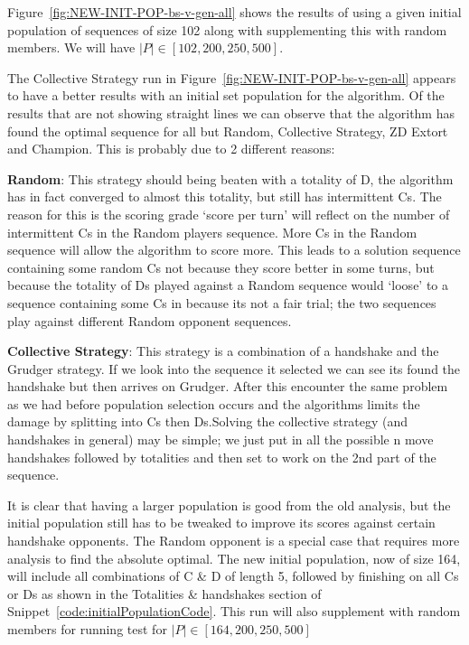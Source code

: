 Figure~\ref{fig:NEW-INIT-POP-bs-v-gen-all} shows the results of using a given initial population of sequences of size 102 along with supplementing this with random members.
We will have \(|P| \in [102,200,250,500]\).

The Collective Strategy run in Figure~\ref{fig:NEW-INIT-POP-bs-v-gen-all} appears to have a better results with an initial set population for the algorithm.
Of the results that are not showing straight lines we can observe that the algorithm has found the optimal sequence for all but Random, Collective Strategy, ZD Extort and Champion.
This is probably due to 2 different reasons:

\textbf{Random}: This strategy should being beaten with a totality of D, the algorithm has in fact converged to almost this totality, but still has intermittent Cs.
The reason for this is the scoring grade `score per turn' will reflect on the number of intermittent Cs in the Random players sequence.
More Cs in the Random sequence will allow the algorithm to score more.
This leads to a solution sequence containing some random Cs not because they score better in some turns, but because the totality of Ds played against
a Random sequence would `loose' to a sequence containing some Cs in because its not a fair trial;
the two sequences play against different Random opponent sequences.

\textbf{Collective Strategy}: This strategy is a combination of a handshake and the Grudger strategy.
If we look into the sequence it selected we can see its found the handshake but then arrives on Grudger.
After this encounter the same problem as we had before population selection occurs and the algorithms limits the damage by splitting into Cs then Ds.Solving the collective strategy (and handshakes in general) may be simple;
we just put in all the possible n move handshakes followed by totalities and then set to work on the 2nd part of the sequence.

It is clear that having a larger population is good from the old analysis, but the initial population still has to be tweaked to improve its scores against certain handshake opponents.
The Random opponent is a special case that requires more analysis to find the absolute optimal.
The new initial population, now of size 164, will include all combinations of C \& D of length 5, followed by finishing on all Cs or Ds as shown in the Totalities \& handshakes section of Snippet~\ref{code:initialPopulationCode}.
This run will also supplement with random members for running test for \(|P| \in [164,200,250,500]\)

